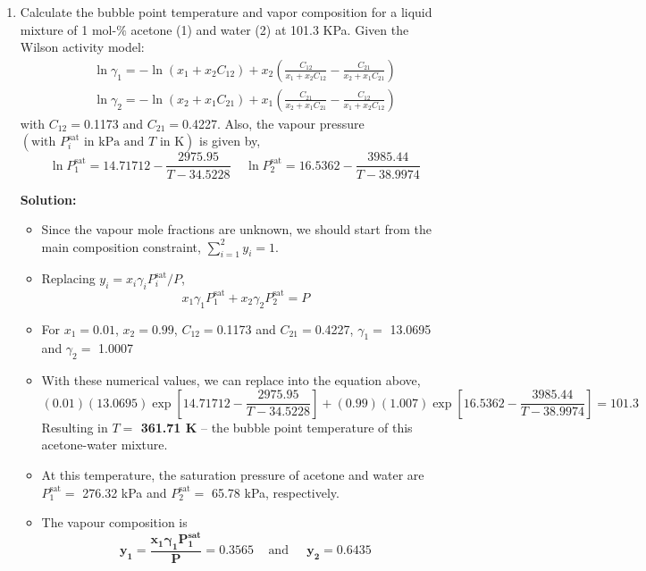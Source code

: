 \documentclass[12pts,a4paper,amsmath,amssymb,floatfix]{article}%
\newcommand{\frc}{\displaystyle\frac}
\begin{document}
\begin{enumerate}[label=\bfseries Example \arabic*]
\item\label{Example:2} Calculate the bubble point temperature and vapor composition for a liquid mixture of 1 mol-$\%$ acetone (1) and water (2) at 101.3 KPa. Given the Wilson activity model:
   \begin{eqnarray}
       &&\ln\gamma_{1} = -\ln\left(x_{1}+x_{2}C_{12}\right) + x_{2}\left(\frc{C_{12}}{x_{1}+x_{2}C_{12}}-\frc{C_{21}}{x_{2}+x_{1}C_{21}}\right) \nonumber \\
       &&\ln\gamma_{2} = -\ln\left(x_{2}+x_{1}C_{21}\right) + x_{1}\left(\frc{C_{21}}{x_{2}+x_{1}C_{21}}-\frc{C_{12}}{x_{1}+x_{2}C_{12}}\right) \nonumber
   \end{eqnarray}
   with $C_{12}=$0.1173 and $C_{21}=$0.4227. Also, the vapour pressure $\left(\text{with } P_{i}^{\text{sat}}\text{ in kPa and } T\text{ in K}\right)$ is given by,
\begin{displaymath}
   \ln P_{1}^{\text{sat}} = 14.71712 - \frc{2975.95}{T-34.5228} \;\;\;\; \ln P_{2}^{\text{sat}} = 16.5362 - \frc{3985.44}{T-38.9974}
\end{displaymath}


\bigskip

{\large{\bf Solution:}}

   \begin{itemize}
      \item Since the vapour mole fractions are unknown, we should start from the main composition constraint, $\sum\limits_{i=1}^{2}y_{i} = 1$.  
      \item Replacing $y_{i}=x_{i}\gamma_{i}P_{i}^{\text{sat}}/P$,
         \begin{displaymath}
            x_{1}\gamma_{1}P_{1}^{\text{sat}} + x_{2}\gamma_{2}P_{2}^{\text{sat}} = P
         \end{displaymath}
      \item For $x_{1} = 0.01$, $x_{2}=0.99$, $C_{12}=$0.1173 and $C_{21}=$0.4227, $\gamma_{1}=$ 13.0695 and $\gamma_{2}=$ 1.0007
      \item With these numerical values, we can replace into the equation above,
         \begin{displaymath}
            (0.01)(13.0695)\exp\left[14.71712 - \frc{2975.95}{T-34.5228}\right] + (0.99)(1.007)\exp\left[16.5362 - \frc{3985.44}{T-38.9974}\right] =  101.3
         \end{displaymath}
         Resulting in {\bf $T=$ 361.71 K} -- the bubble point temperature of this acetone-water mixture.
      \item At this temperature, the saturation pressure of acetone and water are $P_{1}^{\text{sat}}=$ 276.32 kPa and $P_{2}^{\text{sat}}=$ 65.78 kPa, respectively.
      \item The vapour composition is
         \begin{displaymath}
             \mathbf{y_{1} =\frc{x_{1}\gamma_{1}P_{1}^{\text{sat}}}{P} = 0.3565}\;\;\;\text{ and }\;\;\;\; \mathbf{y_{2} = 0.6435}
         \end{displaymath} 
   \end{itemize}
\clearpage


\end{enumerate}
\end{document}
